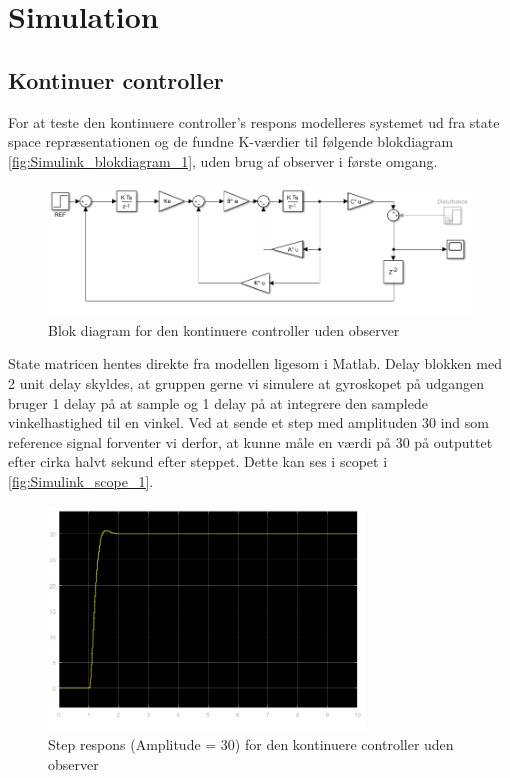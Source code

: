 \section{Simulation}
\subsection{Kontinuer controller}
For at teste den kontinuere controller's respons modelleres systemet ud fra state space repræsentationen og de fundne K-værdier til følgende blokdiagram \autoref{fig:Simulink_blokdiagram_1}, uden brug af observer i første omgang. 

\begin{figure}[H]
	\centering
	\includegraphics[width = 1\textwidth]{figur/Simulink_blokdiagram_1}
	\caption{Blok diagram for den kontinuere controller uden observer}
	\label{fig:Simulink_blokdiagram_1}
\end{figure}

State matricen hentes direkte fra modellen ligesom i Matlab. Delay blokken med 2 unit delay skyldes, at gruppen gerne vi simulere at gyroskopet på udgangen bruger 1 delay på at sample og 1 delay på at integrere den samplede vinkelhastighed til en vinkel. Ved at sende et step med amplituden 30 ind som reference signal forventer vi derfor, at kunne måle en værdi på 30 på outputtet efter cirka halvt sekund efter steppet. Dette kan ses i scopet i \autoref{fig:Simulink_scope_1}.

\begin{figure}[H]
	\centering
	\includegraphics[width = 0.75\textwidth]{figur/Simulink_scope_1}
	\caption{Step respons (Amplitude = 30) for den kontinuere controller uden observer}
	\label{fig:Simulink_scope_1}
\end{figure}

